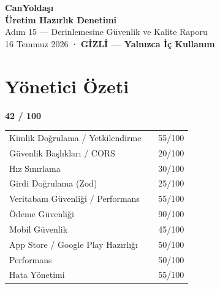 \documentclass[12pt,a4paper]{article}
\begin{document}
\begin{center}
  \vspace*{0.5em}
  {\LARGE\bfseries\color{primary} CanYoldaşı}\\[0.4em]
  {\Large\bfseries Üretim Hazırlık Denetimi}\\[0.3em]
  {\normalsize\color{gray} Adım 15 — Derinlemesine Güvenlik ve Kalite Raporu}\\[0.2em]
  {\normalsize\color{gray} 16 Temmuz 2026 · \textbf{GİZLİ — Yalnızca İç Kullanım}}
  \vspace{0.5em}
\end{center}

\section{Yönetici Özeti}

\begin{tcolorbox}[colback=primary!6!white, colframe=primary, fonttitle=\bfseries, title=Genel Üretim Hazırlık Skoru]
\begin{center}
  \Huge\bfseries\color{primary} 42 / 100
\end{center}
\vspace{0.3em}
\begin{tabularx}{\textwidth}{lXr}
  Kimlik Doğrulama / Yetkilendirme & & 55/100 \\
  Güvenlik Başlıkları / CORS        & & 20/100 \\
  Hız Sınırlama                     & & 30/100 \\
  Girdi Doğrulama (Zod)             & & 25/100 \\
  Veritabanı Güvenliği / Performans & & 55/100 \\
  Ödeme Güvenliği                   & & 90/100 \\
  Mobil Güvenlik                    & & 45/100 \\
  App Store / Google Play Hazırlığı & & 50/100 \\
  Performans                        & & 50/100 \\
  Hata Yönetimi                     & & 55/100 \\
\end{tabularx}
\end{tcolorbox}
\end{document}
